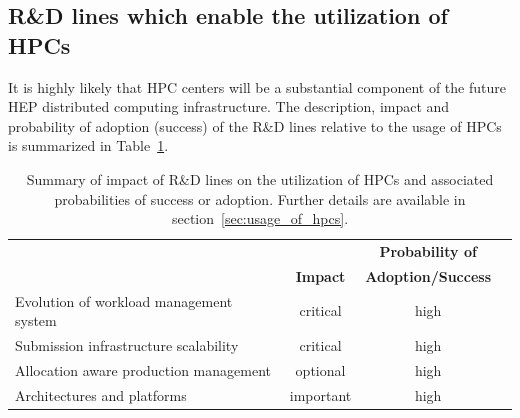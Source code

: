 \documentclass{cmspaper}
\newcommand{\trh}{\cellcolor{tablerowheader}}
\newcommand{\B}[1]{\textbf{#1}}
\begin{document}
\subsection{R\&D lines which enable the utilization of HPCs}

It is highly likely that HPC centers will be a substantial component of the future HEP distributed computing infrastructure. The description, impact and probability of adoption (success) of the R\&D lines relative to the usage of HPCs is summarized in Table~\ref{tab:summary-hpcs}. 

\begin{table}[ht]
\begin{center}
\caption{Summary of impact of R\&D lines on the utilization of HPCs and associated probabilities of success or adoption. Further details are available in section~\ref{sec:usage_of_hpcs}.}
\label{tab:summary-hpcs}
\begin{tabular}{lccc} 
\hline
\rowcolor{tableheader}                                         &                              & \B{Probability of}  \\
\rowcolor{tableheader} \multirow{-2}{*}{\B{Short description}} & \multirow{-2}{*}{\B{Impact}} & \B{Adoption/Success} \\
\hline \hline
\trh Evolution of workload management system & critical  & high \\
\trh Submission infrastructure scalability   & critical  & high \\
\trh Allocation aware production management  & optional  & high \\
\trh Architectures and platforms             & important & high \\
\hline
\end{tabular}
\end{center}
\end{table}
\end{document}
